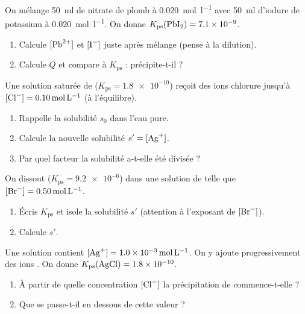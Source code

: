 \documentclass[11pt,a4paper]{article}
\begin{document}
\begin{exo}
On mélange \qty{50}{\milli\litre} de nitrate de plomb  à \qty{0.020}{\mole\per\litre} avec
\qty{50}{\milli\litre} d'iodure de potassium  à \qty{0.020}{\mole\per\litre}. On donne
$K_{\mathrm{ps}}(\ce{PbI2})=\num{7.1e-9}$.
\begin{enumerate}[label=\alph*)]
  \item Calcule $[\ce{Pb^{2+}}]$ et $[\ce{I-}]$ juste après mélange (pense à la dilution).
  \item Calcule $Q$ et compare à $K_{\mathrm{ps}}$ :  précipite-t-il ?
\end{enumerate}
\end{exo}

\begin{exo}
Une solution saturée de  ($K_{\mathrm{ps}}=\num{1.8e-10}$) reçoit des ions chlorure jusqu'à
$[\ce{Cl-}]=\qty{0.10}{\mole\per\litre}$ (à l'équilibre).
\begin{enumerate}[label=\alph*)]
  \item Rappelle la solubilité $s_0$ dans l'eau pure.
  \item Calcule la nouvelle solubilité $s'=[\ce{Ag+}]$.
  \item Par quel facteur la solubilité a-t-elle été divisée ?
\end{enumerate}
\end{exo}

\begin{exo}
On dissout  ($K_{\mathrm{ps}}=\num{9.2e-6}$) dans une solution de  telle que
$[\ce{Br-}]=\qty{0.50}{\mole\per\litre}$.
\begin{enumerate}[label=\alph*)]
  \item Écris $K_{\mathrm{ps}}$ et isole la solubilité $s'$ (attention à l'exposant de $[\ce{Br-}]$).
  \item Calcule $s'$.
\end{enumerate}
\end{exo}

\begin{exo}
Une solution contient $[\ce{Ag+}]=\qty{1.0e-3}{\mole\per\litre}$. On y ajoute progressivement des ions
. On donne $K_{\mathrm{ps}}(\ce{AgCl})=\num{1.8e-10}$.
\begin{enumerate}[label=\alph*)]
  \item À partir de quelle concentration $[\ce{Cl-}]$ la précipitation de  commence-t-elle ?
  \item Que se passe-t-il en dessous de cette valeur ?
\end{enumerate}
\end{exo}
\end{document}
